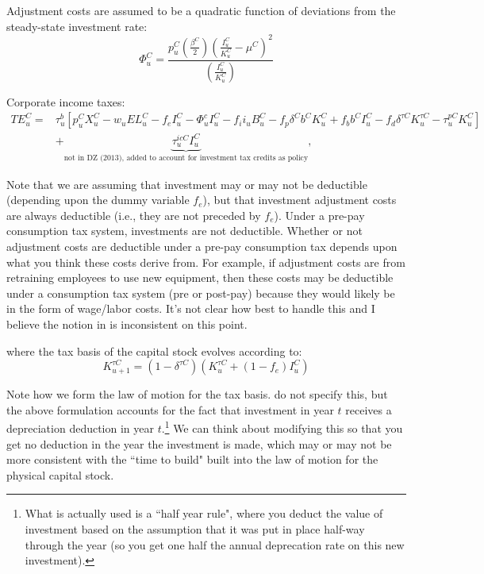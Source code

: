 Adjustment costs are assumed to be a quadratic function of deviations from the steady-state investment rate:
\begin{equation}
\label{eqn:adj_cost}
\Phi^{C}_{u}=\frac{p^{C}_{u}\left(\frac{\beta^{C}}{2}\right)\left(\frac{I^{C}_{u}}{K^{C}_{u}}-\mu^{C}\right)^{2}}{\left(\frac{I^{C}_{u}}{K^{C}_{u}}\right)}
\end{equation}

Corporate income taxes:
\begin{equation}
\label{eqn:corp_tax}
\begin{split}
TE^{C}_{u}= & \tau^{b}_{u}\left[p^{C}_{u}X^{C}_{u}-w_{u}EL^{C}_{u}-f_{e}I^{C}_{u}-\Phi^{c}_{u}I^{C}_{u}-f_{i}i_{u}B^{C}_{u}-f_{p}\delta^{C}b^{C}K^{C}_{u}+f_{b}b^{C}I^{C}_{u}-f_{d}\delta^{\tau C}K^{\tau C}_{u}-\tau^{pC}_{u}K^{C}_{u}\right] \\
& +\underbrace{\tau^{icC}_{u}I^{C}_{u}}_{\text{not in DZ (2013), added to account for investment tax credits as policy}},
\end{split}
\end{equation}

\noindent\noindent  Note that we are assuming that investment may or may not be deductible (depending upon the dummy variable $f_{e}$), but that investment adjustment costs are always deductible (i.e., they are not preceded by $f_{e}$).  Under a pre-pay consumption tax system, investments are not deductible.  Whether or not adjustment costs are deductible under a pre-pay consumption tax depends upon what you think these costs derive from.  For example, if adjustment costs are from retraining employees to use new equipment, then these costs may be deductible under a consumption tax system (pre or post-pay) because they would likely be in the form of wage/labor costs. It's not clear how best to handle this and I believe the notion in \citet{DZ2013} is inconsistent on this point.

\noindent\noindent where the tax basis of the capital stock evolves according to:
\begin{equation}
\label{eqn:lom_taxcapital}
K^{\tau C}_{u+1}=(1-\delta^{\tau C})(K^{\tau C}_{u} + (1-f_{e})I^{C}_{u})
\end{equation}

Note how we form the law of motion for the tax basis.  \citet{DZ2013} do not specify this, but the above formulation accounts for the fact that investment in year $t$ receives a depreciation deduction in year $t$.\footnote{What is actually used is a ``half year rule", where you deduct the value of investment based on the assumption that it was put in place half-way through the year (so you get one half the annual deprecation rate on this new investment).}  We can think about modifying this so that you get no deduction in the year the investment is made, which may or may not be more consistent with the ``time to build" built into the law of motion for the physical capital stock.

